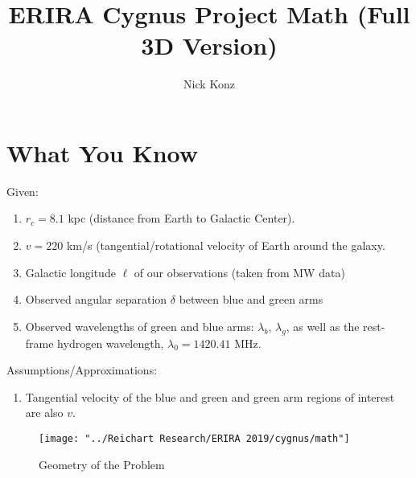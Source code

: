 \documentclass[12pt]{article}
\author{Nick Konz}
\title{ERIRA Cygnus Project Math (Full 3D Version)}
\begin{document}
	\maketitle
	\section{What You Know}
	\par	Given: 
	\begin{enumerate}
		\item $r_c = 8.1$ kpc (distance from Earth to Galactic Center).
		\item $v = 220$ km/s (tangential/rotational velocity of Earth around the galaxy.
		\item Galactic longitude $\ell$ of our observations (taken from MW data)
		\item Observed angular separation $\delta$ between blue and green arms
		\item Observed wavelengths of green and blue arms: $\lambda_b$, $\lambda_g$, as well as the rest-frame hydrogen wavelength, $\lambda_0=1420.41$ MHz.
	\end{enumerate}
	\par Assumptions/Approximations:
	\begin{enumerate}
		\item Tangential velocity of the blue and green and green arm regions of interest are also $v$.
	\end{enumerate}
	\begin{figure}[H]
		\centering
		\texttt{[image: "../Reichart Research/ERIRA 2019/cygnus/math"]}
		\caption{Geometry of the Problem}
		\label{fig:math}
	\end{figure}
\end{document}
